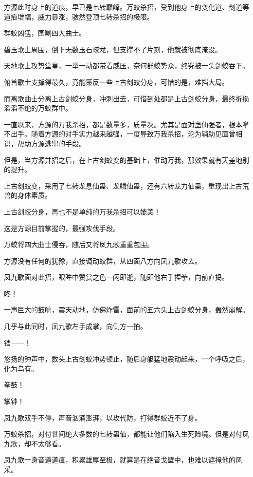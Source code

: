 
\begin{this_body}

方源此时身上的道痕，早已是七转巅峰。万蛟杀招，受到他身上的变化道、剑道等道痕增幅，威力暴涨，骇然登顶七转杀招的极限。

群蛟凶猛，围剿四大曲士。

碧玉歌士周围，倒下无数玉石蛟龙，但支撑不了片刻，他就被彻底淹没。

天地歌士攻势堂皇，一举一动都带着威压，奈何群蛟势众，终究被一头剑蛟吞下。

俯首歌士支撑得最久，竟能策反一些上古剑蛟分身，可惜的是，难挡大局。

而离歌曲士分离上古剑蛟分身，冲刺出去，可惜到处都是上古剑蛟分身，最终折损滔滔不绝的万蛟群中。

一直以来，方源的万我杀招，都是数量多，质量次。尤其是面对蛊仙强者，根本拿不出手。随着方源的对手实力越来越强，一度导致万我杀招，沦为辅助见面曾相识，帮助方源逃窜的手段。

但是，当方源并招之后，在上古剑蛟变的基础上，催动万我，那效果就有天差地别的提升。

上古剑蛟变，采用了七转龙息仙蛊、龙鳞仙蛊，还有六转龙力仙蛊，重现出上古荒兽的身体素质。

上古剑蛟分身，再也不是单纯的万我杀招可以媲美！

这是方源目前掌握的，最强攻伐手段。

万蛟将四大曲士侵吞，随后又将凤九歌重重包围。

方源没有任何的犹豫，直接调动蛟群，从四面八方向凤九歌攻去。

凤九歌面对此招，眼眸中赞赏之色一闪即逝，随即他右手捏拳，向前直捣。

咚！

一声巨大的鼓响，震天动地，仿佛炸雷，面前的五六头上古剑蛟分身，轰然崩解。

几乎与此同时，凤九歌左手成掌，向侧方一拍。

铛——！

悠扬的钟声中，数头上古剑蛟冲势顿止，随后身躯猛地震动起来，一个呼吸之后，化为乌有。

拳鼓！

掌钟！

凤九歌双手不停，声音汹涌澎湃，以攻代防，打得群蛟近不了身。

万蛟杀招，对付世间绝大多数的七转蛊仙，都能让他们陷入生死险境。但是对付凤九歌，却不太够看。

凤九歌一身音道道痕，积累雄厚至极，就算是在绝音戈壁中，也难以遮掩他的风采。


\end{this_body}
